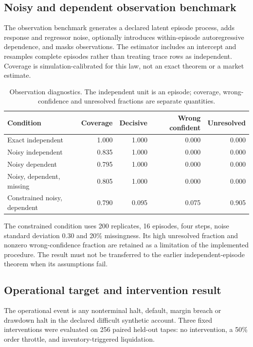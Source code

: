 \documentclass[11pt,a4paper]{article}
\theoremstyle{definition}
\theoremstyle{remark}
\begin{document}
\subsection{Noisy and dependent observation benchmark}
The observation benchmark generates a declared latent episode process, adds response and regressor noise, optionally introduces within-episode autoregressive dependence, and masks observations. The estimator includes an intercept and resamples complete episodes rather than treating trace rows as independent. Coverage is simulation-calibrated for this law, not an exact theorem or a market estimate.

\begin{table}[htbp]
\centering\small
\caption{Observation diagnostics. The independent unit is an episode; coverage, wrong-confidence and unresolved fractions are separate quantities.}
\label{tab:next_observation}
\begin{tabular}{lrrrr}
\toprule
Condition & Coverage & Decisive & Wrong confident & Unresolved\\
\midrule
Exact independent & 1.000 & 1.000 & 0.000 & 0.000\\
Noisy independent & 0.835 & 1.000 & 0.000 & 0.000\\
Noisy dependent & 0.795 & 1.000 & 0.000 & 0.000\\
Noisy, dependent, missing & 0.805 & 1.000 & 0.000 & 0.000\\
Constrained noisy, dependent & 0.790 & 0.095 & 0.075 & 0.905\\
\bottomrule
\end{tabular}
\end{table}

The constrained condition uses 200 replicates, 16 episodes, four steps, noise standard deviation 0.30 and 20\% missingness. Its high unresolved fraction and nonzero wrong-confidence fraction are retained as a limitation of the implemented procedure. The result must not be transferred to the earlier independent-episode theorem when its assumptions fail.

\subsection{Operational target and intervention result}
The operational event is any nonterminal halt, default, margin breach or drawdown halt in the declared difficult synthetic account. Three fixed interventions were evaluated on 256 paired held-out tapes: no intervention, a 50\% order throttle, and inventory-triggered liquidation.
\end{document}
